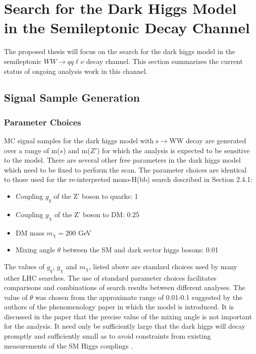 \documentclass[12pt]{article}
\begin{document}
\section{Search for the Dark Higgs Model in the Semileptonic Decay Channel}

The proposed thesis will focus on the search for the dark higgs model in the semileptonic $WW\rightarrow qq\ell\nu$ decay channel. This section summarizes the current status of ongoing analysis work in this channel. 

\subsection{Signal Sample Generation}

\subsubsection{Parameter Choices}

MC signal samples for the dark higgs model with s$\rightarrow$WW decay are generated over a range of m($s$) and m($Z'$) for which the analysis is expected to be sensitive to the model. There are several other free parameters in the dark higgs model which need to be fixed to perform the scan. The parameter choices are identical to those used for the re-interpreted mono-H(bb) search described in Section 2.4.1:

\begin{itemize}
	\item Coupling $g_{q}$ of the Z' boson to quarks: 1 
	\item Coupling $g_{\chi}$ of the Z' boson to DM: 0.25
	\item DM mass $m_{\chi} = 200$ GeV
	\item Mixing angle $\theta$ between the SM and dark sector higgs bosons: 0.01
\end{itemize}

The values of $g_q$, $g_\chi$ and $m_\chi$, listed above are standard choices used by many other LHC searches. The use of standard parameter choices facilitates comparisons and combinations of search results between different analyses. The value of $\theta$ was chosen from the approximate range of 0.01-0.1 suggested by the authors of the phenomenology paper \cite{dark_higgs} in which the model is introduced. It is discussed in the paper that the precise value of the mixing angle is not important for the analysis. It need only be sufficiently large that the dark higgs will decay promptly and sufficiently small as to avoid constraints from existing measurements of the SM Higgs couplings \cite{Aad_2016}. 
\end{document}
